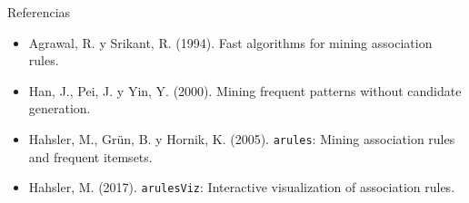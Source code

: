 \documentclass[10pt,aspectratio=169]{beamer}
\begin{document}
\begin{frame}{Referencias}
\begin{itemize}
  \item Agrawal, R. y Srikant, R. (1994). Fast algorithms for mining association rules.
  \item Han, J., Pei, J. y Yin, Y. (2000). Mining frequent patterns without candidate generation.
  \item Hahsler, M., Grün, B. y Hornik, K. (2005). \texttt{arules}: Mining association rules and frequent itemsets.
  \item Hahsler, M. (2017). \texttt{arulesViz}: Interactive visualization of association rules.
\end{itemize}
\end{frame}
\end{document}
